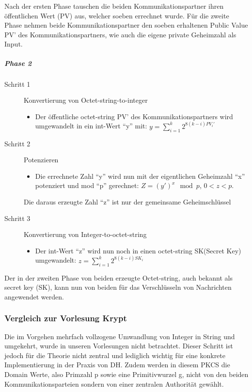 \documentclass[10pt,a4paper]{article}
\begin{document}
Nach der ersten Phase tauschen die beiden Kommunikationspartner ihren öffentlichen Wert
(PV) aus, welcher soeben errechnet wurde. Für die zweite Phase nehmen beide
Kommunikationspartner den soeben erhaltenen Public Value PV' des Kommunikationspartners,
wie auch die eigene private Geheimzahl als Input.

\subparagraph{Phase 2}
\begin{description}
    \item[Schritt 1] Konvertierung von Octet-string-to-integer
        \begin{itemize}
            \item Der öffentliche octet-string PV' des Kommunikationspartners wird
                umgewandelt in ein int-Wert "`y"' mit: $y = \sum_{i=1}^k 2^{8(k-i) PV_i'}$
        \end{itemize}
    \item[Schritt 2] Potenzieren
        \begin{itemize}
            \item Die errechnete Zahl "`y"' wird nun mit der eigentlichen Geheimzahl "`x"'
                potenziert und mod "`p"' gerechnet: $Z = (y')^x \mod p$, $0 < z < p$.
        \end{itemize}
        Die daraus erzeugte Zahl "`z"' ist nur der gemeinsame Geheimschlüssel
    \item[Schritt 3] Konvertierung von Integer-to-octet-string
        \begin{itemize}
            \item Der int-Wert "`z"' wird nun noch in einen octet-string SK(Secret Key)
                umgewandelt: $z = \sum_{i=1}^k 2^{8(k-i)SK_i}$
        \end{itemize}
\end{description}

Der in der zweiten Phase von beiden erzeugte Octet-string, auch bekannt als secret key
(SK), kann nun von beiden für das Verschlüsseln von Nachrichten angewendet werden.

\subsubsection{Vergleich zur Vorlesung Krypt}
Die im Vorgehen mehrfach vollzogene Umwandlung von Integer in String und umgekehrt, wurde
in unseren Vorlesungen nicht betrachtet. Dieser Schritt ist jedoch für die Theorie nicht
zentral und lediglich wichtig für eine konkrete Implementierung in der Praxis von DH.
Zudem werden in diesem PKCS die Domain Werte, also Primzahl p sowie eine Primitivwurzel g,
nicht von den beiden Kommunikationsparteien sondern von einer zentralen Authorität
gewählt.
\end{document}
